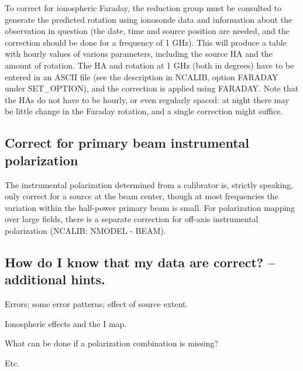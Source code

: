 To correct for ionospheric Faraday, the reduction group must be consulted to
generate the predicted rotation using ionosonde data and information about the
observation in question (the date, time and source position are needed, and the
correction should be done for a frequency of 1 GHz). This will produce a table
with hourly values of various parameters, including the source HA and the
amount of rotation. The HA and rotation at 1 GHz (both in degrees) have to be
entered in an ASCII file (see the description in NCALIB, option FARADAY under
SET\_OPTION), and the correction is applied using FARADAY. Note that the HAs do
not have to be hourly, or even regularly spaced: at night there may be little
change in the Faraday rotation, and a single correction might suffice.

\subsection{Correct for primary beam instrumental polarization}
\label{.beam}

The instrumental polarization determined from a calibrator is, strictly
speaking, only correct for a source at the beam center, though at most
frequencies the variation within the half-power primary beam is small. For
polarization mapping over large fields, there is a separate correction for
off-axis instrumental polarization (NCALIB: NMODEL - BEAM).

\subsection{How do I know that my data are correct? -- additional hints.}
\label{.hints}

Errors; some error patterns; effect of source extent.

Ionospheric effects and the I map.

What can be done if a polarization combination is missing?

Etc.

